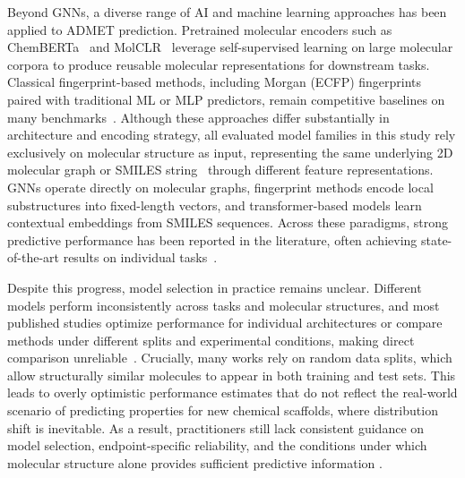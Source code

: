 \documentclass[journal]{IEEEtran}
\begin{document}
Beyond GNNs, a diverse range of AI and machine learning approaches has been applied to ADMET prediction. Pretrained molecular encoders such as ChemBERTa~\cite{chemberta2} and MolCLR~\cite{molclr} leverage self-supervised learning on large molecular corpora to produce reusable molecular representations for downstream tasks. Classical fingerprint-based methods, including Morgan (ECFP) fingerprints~\cite{rogers2010ecfp} paired with traditional ML or MLP predictors, remain competitive baselines on many benchmarks~\cite{maplight, rdkit2d_mlp}. Although these approaches differ substantially in architecture and encoding strategy, all evaluated model families in this study rely exclusively on molecular structure as input, representing the same underlying 2D molecular graph or SMILES string~\cite{weininger1988smiles} through different feature representations. GNNs operate directly on molecular graphs, fingerprint methods encode local substructures into fixed-length vectors, and transformer-based models learn contextual embeddings from SMILES sequences. Across these paradigms, strong predictive performance has been reported in the literature, often achieving state-of-the-art results on individual tasks~\cite{huang2021therapeuticsdatacommonsmachine}.

Despite this progress, model selection in practice remains unclear. Different models perform inconsistently across tasks and molecular structures, and most published studies optimize performance for individual architectures or compare methods under different splits and experimental conditions, making direct comparison unreliable~\cite{wu2018moleculenet, yang2019dmpnn}. Crucially, many works rely on random data splits, which allow structurally similar molecules to appear in both training and test sets. This leads to overly optimistic performance estimates that do not reflect the real-world scenario of predicting properties for new chemical scaffolds, where distribution shift is inevitable. As a result, practitioners still lack consistent guidance on model selection, endpoint-specific reliability, and the conditions under which molecular structure alone provides sufficient predictive information \cite{wu2018moleculenet, huang2021therapeuticsdatacommonsmachine}.
\end{document}
